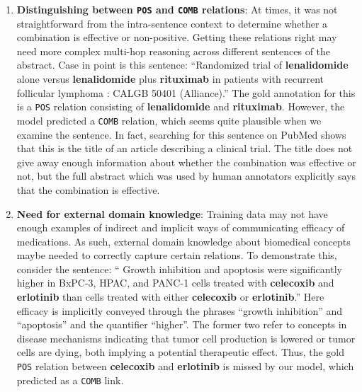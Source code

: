\documentclass[conference]{IEEEtran}
\begin{document}
\begin{enumerate}
    \item \textbf{Distinguishing between \texttt{POS} and \texttt{COMB} relations}: At times, it was not straightforward from the intra-sentence context to determine whether a combination is effective or non-positive. Getting these relations right may need more complex multi-hop reasoning across different sentences of the abstract. Case in point is this sentence: ``Randomized trial of \textbf{lenalidomide} alone versus \textbf{lenalidomide} plus \textbf{rituximab}  in patients with recurrent follicular lymphoma : CALGB 50401 (Alliance).'' The gold annotation for this is a \texttt{POS} relation consisting of 
    \textbf{lenalidomide} and \textbf{rituximab}. However, the model predicted a \texttt{COMB} relation, which seems quite plausible when we examine the sentence. In fact, searching for this sentence on PubMed shows that this is the title of an article describing a clinical trial. The title does not give away enough information about whether the combination was effective or not, but the full abstract which was used by human annotators explicitly says that the combination is effective. 

     \item \textbf{Need for external domain knowledge}: Training data may  not have enough examples of indirect and implicit ways of communicating efficacy of medications. As such, external domain knowledge about biomedical concepts maybe needed to correctly capture certain relations. To demonstrate this, consider the sentence: ``{\color{blue} Growth inhibition} and {\color{blue}apoptosis} were significantly {\color{blue}higher} in BxPC-3, HPAC, and  PANC-1 cells treated with \textbf{celecoxib} and \textbf{erlotinib} than cells treated with either  \textbf{celecoxib} or \textbf{erlotinib}.'' Here efficacy is implicitly conveyed through the phrases ``growth inhibition'' and ``apoptosis'' and the quantifier ``higher''. The former two refer to concepts in disease mechanisms indicating that tumor cell production is lowered or tumor cells are dying, both implying a potential therapeutic effect. Thus, the gold \texttt{POS} relation between  \textbf{celecoxib} and \textbf{erlotinib} is missed by our model, which predicted as a \texttt{COMB} link. 
\end{enumerate}
\end{document}
